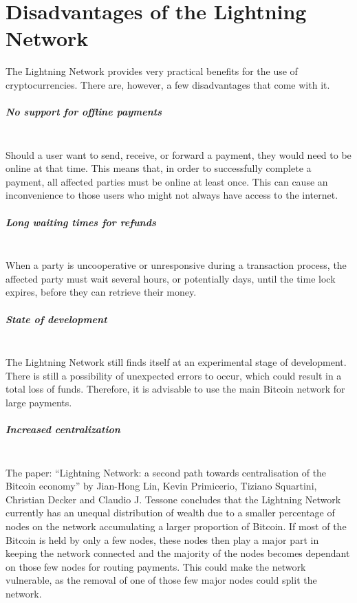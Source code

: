 \documentclass[a4paper, 12pt]{report}
\begin{document}
\chapter{Disadvantages of the Lightning Network}

\par The Lightning Network provides very practical benefits for the use of cryptocurrencies. There are, however, a few disadvantages that come with it.

\paragraph{No support for offline payments} \hspace{0pt} \\
Should a user want to send, receive, or forward a payment, they would need to be online at that time. This means that, in order to successfully complete a payment, all affected parties must be online at least once. This can cause an inconvenience to those users who might not always have access to the internet.

\paragraph{Long waiting times for refunds} \hspace{0pt} \\
When a party is uncooperative or unresponsive during a transaction process, the affected party must wait several hours, or potentially days, until the time lock expires, before they can retrieve their money.

\paragraph{State of development} \hspace{0pt} \\
The Lightning Network still finds itself at an experimental stage of development. There is still a possibility of unexpected errors to occur, which could result in a total loss of funds. Therefore, it is advisable to use the main Bitcoin network for large payments.

\paragraph{Increased centralization} \hspace{0pt} \\
The paper: “Lightning Network: a second path towards centralisation of the Bitcoin economy” \cite{jian} by Jian-Hong Lin, Kevin Primicerio, Tiziano Squartini, Christian Decker and Claudio J. Tessone concludes that the Lightning Network currently has an unequal distribution of wealth due to a smaller percentage of nodes on the network accumulating a larger proportion of Bitcoin. If most of the Bitcoin is held by only a few nodes, these nodes then play a major part in keeping the network connected and the majority of the nodes becomes dependant on those few nodes for routing payments. This could make the network vulnerable, as the removal of one of those few major nodes could split the network.
\end{document}
